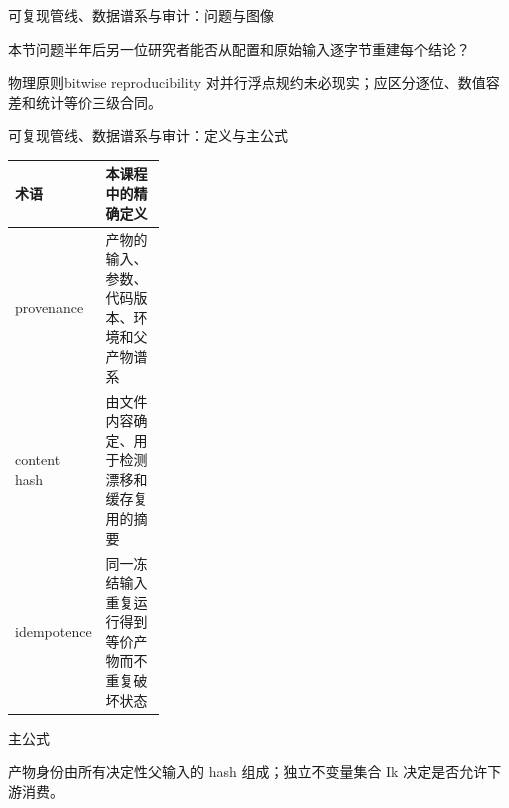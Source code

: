 \begin{frame}[t]{可复现管线、数据谱系与审计：问题与图像}
\footnotesize
\begin{block}{本节问题}半年后另一位研究者能否从配置和原始输入逐字节重建每个结论？\end{block}
\begin{block}{物理原则}\quad bitwise reproducibility 对并行浮点规约未必现实；应区分逐位、数值容差和统计等价三级合同。\end{block}
\end{frame}

\begin{frame}[t]{可复现管线、数据谱系与审计：定义与主公式}
\footnotesize\begin{tabularx}{\linewidth}{p{0.30\linewidth}Y}
\toprule 术语 & 本课程中的精确定义\\\midrule
{} provenance & 产物的输入、参数、代码版本、环境和父产物谱系\\
 content hash & 由文件内容确定、用于检测漂移和缓存复用的摘要\\
 idempotence & 同一冻结输入重复运行得到等价产物而不重复破坏状态\\
\bottomrule\end{tabularx}\vspace{0.15cm}
\begin{block}{ 主公式}\centering{}\end{block}
产物身份由所有决定性父输入的 hash 组成；独立不变量集合 Ik 决定是否允许下游消费。
\end{frame}

